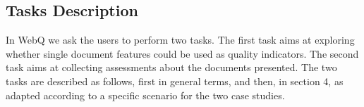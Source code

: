 \documentclass{llncs}
\begin{document}
\subsection{Tasks Description}
In WebQ we ask the users to perform two tasks. The first task aims at exploring whether single document features could be used as quality indicators. The second task aims at collecting assessments about the documents presented. The two tasks are described as follows, first in general terms, and then, in section 4, as adapted according to a specific scenario for the two case studies.
%
%
%
%
%
%
\end{document}
